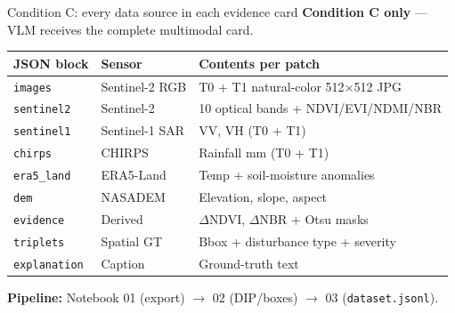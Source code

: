 \documentclass[aspectratio=169,10pt]{beamer}
\begin{document}
\begin{frame}{Condition C: every data source in each evidence card}
  \small
  \textbf{Condition C only} --- VLM receives the complete multimodal card.

  \vspace{0.25em}
  \begin{tabular}{@{}llp{5.8cm}@{}}
    \toprule
    \textbf{JSON block} & \textbf{Sensor} & \textbf{Contents per patch} \\
    \midrule
    \texttt{images}           & Sentinel-2 RGB     & T0 + T1 natural-color 512$\times$512 JPG \\
    \texttt{sentinel2}        & Sentinel-2         & 10 optical bands + NDVI/EVI/NDMI/NBR \\
    \texttt{sentinel1}        & Sentinel-1 SAR     & VV, VH (T0 + T1) \\
    \texttt{chirps}           & CHIRPS             & Rainfall mm (T0 + T1) \\
    \texttt{era5\_land}       & ERA5-Land          & Temp + soil-moisture anomalies \\
    \texttt{dem}              & NASADEM            & Elevation, slope, aspect \\
    \texttt{evidence}         & Derived            & $\Delta$NDVI, $\Delta$NBR + Otsu masks \\
    \texttt{triplets}         & Spatial GT         & Bbox + disturbance type + severity \\
    \texttt{explanation}      & Caption            & Ground-truth text \\
    \bottomrule
  \end{tabular}

  \vspace{0.3em}
  \textbf{Pipeline:} Notebook 01 (export) $\rightarrow$ 02 (DIP/boxes) $\rightarrow$ 03 (\texttt{dataset.jsonl}).
\end{frame}
\end{document}
